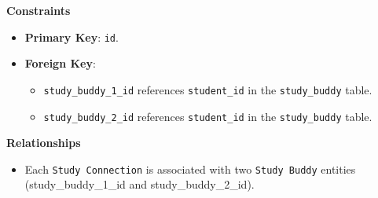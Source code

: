 \documentclass[12pt]{article}
\begin{document}
    \noindent 
    \textbf{Constraints}
    \begin{itemize} 
        \item \textbf{Primary Key}: \texttt{id}. 
        \item \textbf{Foreign Key}: \begin{itemize} \item \texttt{study\_buddy\_1\_id} references \texttt{student\_id} in the \texttt{study\_buddy} table. 
        \item \texttt{study\_buddy\_2\_id} references \texttt{student\_id} in the \texttt{study\_buddy} table. 
        \end{itemize} 
    \end{itemize}

    \noindent 
    \textbf{Relationships} 
    \begin{itemize} 
        \item Each \texttt{Study Connection} is associated with two \texttt{Study Buddy} entities (study\_buddy\_1\_id and study\_buddy\_2\_id). 
    \end{itemize}
\end{document}
